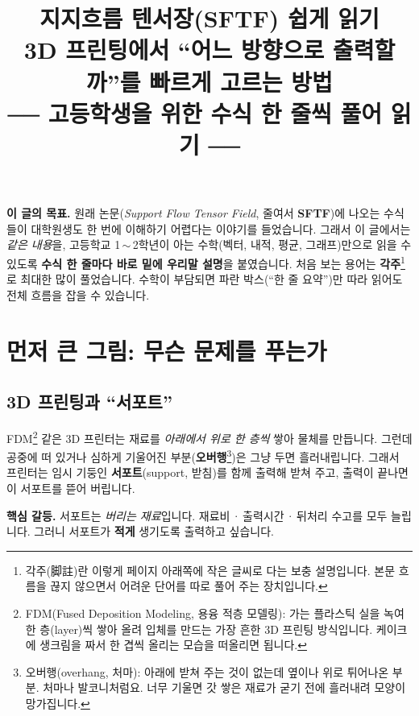 \documentclass[11pt,a4paper]{article}
\title{\textbf{지지흐름 텐서장(SFTF) 쉽게 읽기}\\[4pt]
\large 3D 프린팅에서 ``어느 방향으로 출력할까''를 빠르게 고르는 방법\\[2pt]
\normalsize ── 고등학생을 위한 수식 한 줄씩 풀어 읽기 ──}
\author{}
\date{}
\begin{document}
\maketitle

\begin{readbox}
\textbf{이 글의 목표.} 원래 논문(\emph{Support Flow Tensor Field}, 줄여서
\textbf{SFTF})에 나오는 수식들이 대학원생도 한 번에 이해하기 어렵다는 이야기를
들었습니다. 그래서 이 글에서는 \emph{같은 내용}을, 고등학교 1\,$\sim$\,2학년이
아는 수학(벡터, 내적, 평균, 그래프)만으로 읽을 수 있도록 \textbf{수식 한 줄마다
바로 밑에 우리말 설명}을 붙였습니다. 처음 보는 용어는 \textbf{각주}\footnote{각주(脚註)란
이렇게 페이지 아래쪽에 작은 글씨로 다는 보충 설명입니다. 본문 흐름을 끊지 않으면서
어려운 단어를 따로 풀어 주는 장치입니다.}로 최대한 많이 풀었습니다. 수학이 부담되면
파란 박스(``한 줄 요약'')만 따라 읽어도 전체 흐름을 잡을 수 있습니다.
\end{readbox}

\tableofcontents
\bigskip

\section{먼저 큰 그림: 무슨 문제를 푸는가}

\subsection{3D 프린팅과 ``서포트''}

FDM\footnote{FDM(Fused Deposition Modeling, 용융 적층 모델링): 가는 플라스틱 실을
녹여 한 층(layer)씩 쌓아 올려 입체를 만드는 가장 흔한 3D 프린팅 방식입니다. 케이크에
생크림을 짜서 한 겹씩 올리는 모습을 떠올리면 됩니다.} 같은 3D 프린터는 재료를
\emph{아래에서 위로 한 층씩} 쌓아 물체를 만듭니다. 그런데 공중에 떠 있거나 심하게
기울어진 부분(\textbf{오버행}\footnote{오버행(overhang, 처마): 아래에 받쳐 주는 것이
없는데 옆이나 위로 튀어나온 부분. 처마나 발코니처럼요. 너무 기울면 갓 쌓은 재료가
굳기 전에 흘러내려 모양이 망가집니다.})은 그냥 두면 흘러내립니다. 그래서 프린터는
임시 기둥인 \textbf{서포트}(support, 받침)를 함께 출력해 받쳐 주고, 출력이 끝나면
이 서포트를 뜯어 버립니다.

\begin{notebox}
\textbf{핵심 갈등.} 서포트는 \emph{버리는 재료}입니다. 재료비\,·\,출력시간\,·\,뒤처리
수고를 모두 늘립니다. 그러니 서포트가 \textbf{적게} 생기도록 출력하고 싶습니다.
\end{notebox}
\end{document}
